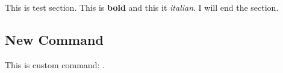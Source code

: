 


This is test section.
This is \textbf{bold} and this it \textit{italian}.
I will end the section.

\subsection{New Command}

This is custom command: \testcmd{}.

